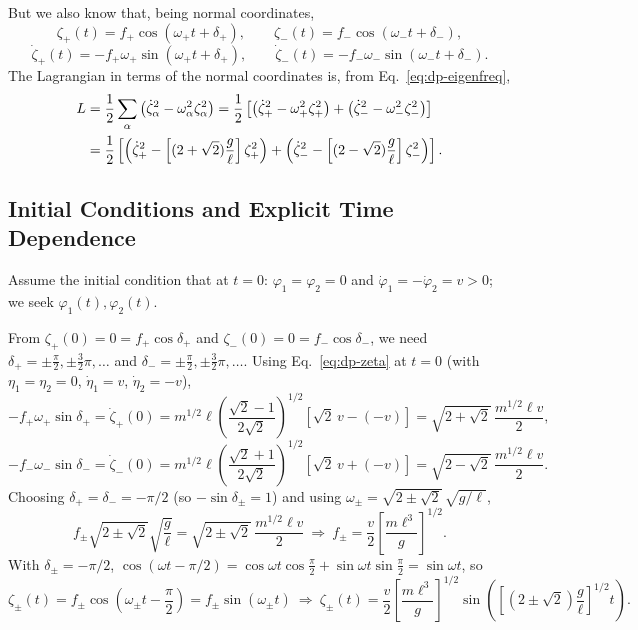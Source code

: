 \documentclass[11pt]{article}
\begin{document}
But we also know that, being normal coordinates,
\begin{equation}
\zeta_+(t) = f_+\cos(\omega_+t+\delta_+), \qquad \zeta_-(t) = f_-\cos(\omega_-t+\delta_-),
\end{equation}
\begin{equation}
\dot\zeta_+(t) = -f_+\omega_+\sin(\omega_+t+\delta_+), \qquad \dot\zeta_-(t) = -f_-\omega_-\sin(\omega_-t+\delta_-).
\end{equation}
The Lagrangian in terms of the normal coordinates is, from Eq.~\eqref{eq:dp-eigenfreq},
\begin{align}
L &= \frac12\sum_\alpha\left(\dot\zeta_\alpha^2-\omega_\alpha^2\zeta_\alpha^2\right) = \frac12\left[\left(\dot\zeta_+^2-\omega_+^2\zeta_+^2\right)+\left(\dot\zeta_-^2-\omega_-^2\zeta_-^2\right)\right]\notag\\
&= \frac12\left[\left(\dot\zeta_+^2-\left[(2+\sqrt2)\frac{g}{\ell}\right]\zeta_+^2\right)+\left(\dot\zeta_-^2-\left[(2-\sqrt2)\frac{g}{\ell}\right]\zeta_-^2\right)\right].
\end{align}

\subsection{Initial Conditions and Explicit Time Dependence}

Assume the initial condition that at $t=0$: $\varphi_1=\varphi_2=0$ and $\dot\varphi_1=-\dot\varphi_2=v>0$; we seek $\varphi_1(t),\varphi_2(t)$.

From $\zeta_+(0)=0=f_+\cos\delta_+$ and $\zeta_-(0)=0=f_-\cos\delta_-$, we need $\delta_+=\pm\tfrac\pi2,\pm\tfrac32\pi,\dots$ and $\delta_-=\pm\tfrac\pi2,\pm\tfrac32\pi,\dots$. Using Eq.~\eqref{eq:dp-zeta} at $t=0$ (with $\eta_1=\eta_2=0$, $\dot\eta_1=v$, $\dot\eta_2=-v$),
\begin{equation}
-f_+\omega_+\sin\delta_+ = \dot\zeta_+(0) = m^{1/2}\ell\left(\frac{\sqrt2-1}{2\sqrt2}\right)^{1/2}\left[\sqrt2\,v-(-v)\right] = \sqrt{2+\sqrt2}\,\frac{m^{1/2}\ell v}{2},
\end{equation}
\begin{equation}
-f_-\omega_-\sin\delta_- = \dot\zeta_-(0) = m^{1/2}\ell\left(\frac{\sqrt2+1}{2\sqrt2}\right)^{1/2}\left[\sqrt2\,v+(-v)\right] = \sqrt{2-\sqrt2}\,\frac{m^{1/2}\ell v}{2}.
\end{equation}
Choosing $\delta_+=\delta_-=-\pi/2$ (so $-\sin\delta_\pm=1$) and using $\omega_\pm=\sqrt{2\pm\sqrt2}\,\sqrt{g/\ell}$,
\begin{equation}
f_\pm\sqrt{2\pm\sqrt2}\sqrt{\frac{g}{\ell}} = \sqrt{2\pm\sqrt2}\,\frac{m^{1/2}\ell v}{2} \ \Longrightarrow\ \boxed{f_\pm = \frac{v}{2}\left[\frac{m\ell^3}{g}\right]^{1/2}.}
\end{equation}
With $\delta_\pm=-\pi/2$, $\cos(\omega t-\pi/2)=\cos\omega t\cos\tfrac\pi2+\sin\omega t\sin\tfrac\pi2 = \sin\omega t$, so
\begin{equation}
\zeta_\pm(t) = f_\pm\cos\!\left(\omega_\pm t-\frac\pi2\right) = f_\pm\sin(\omega_\pm t) \ \Longrightarrow\
\boxed{\zeta_\pm(t) = \frac{v}{2}\left[\frac{m\ell^3}{g}\right]^{1/2}\sin\!\left(\left[(2\pm\sqrt2)\frac{g}{\ell}\right]^{1/2}t\right).}
\label{eq:dp-zetat}
\end{equation}
\end{document}
